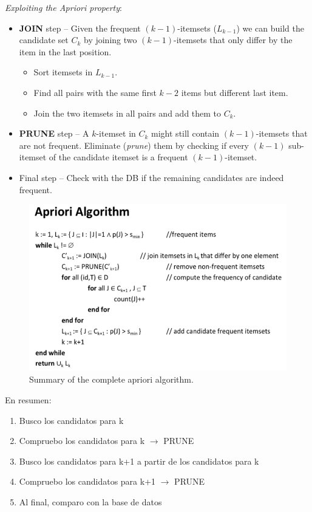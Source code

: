     \emph{Exploiting the Apriori property}:
    \begin{itemize}
      \item \textbf{JOIN} step -- Given the frequent $(k-1)$-itemsets ($L_{k-1}$) we can build the candidate set $C_k$ by joining two $(k-1)$-itemsets that only differ by the item in the last position.
      \begin{itemize}
        \item Sort itemsets in $L_{k-1}$.
        \item Find all pairs with the same first $k-2$ items but different last item.
        \item Join the two itemsets in all pairs and add them to $C_k$.
      \end{itemize}
      \item \textbf{PRUNE} step -- A $k$-itemset in $C_k$ might still contain $(k-1)$-itemsets that are not frequent. Eliminate (\emph{prune}) them by checking if every $(k-1)$ sub-itemset of the candidate itemset is a frequent $(k-1)$-itemset.
      \item Final step -- Check with the DB if the remaining candidates are indeed frequent.
    \end{itemize}

    \begin{figure}[htp]
      \centering
        \includegraphics[width=.6\textwidth]{images/apsum.png}
        \caption{Summary of the complete apriori algorithm.}
        \label{fig:apsum}
    \end{figure}

    En resumen:
    \begin{enumerate}
      \item Busco los candidatos para k
      \item Compruebo los candidatos para k $\rightarrow$ PRUNE
      \item Busco los candidatos para k+1 a partir de los candidatos para k
      \item Compruebo los candidatos para k+1 $\rightarrow$ PRUNE
      \item[] Al final, comparo con la base de datos
    \end{enumerate}

